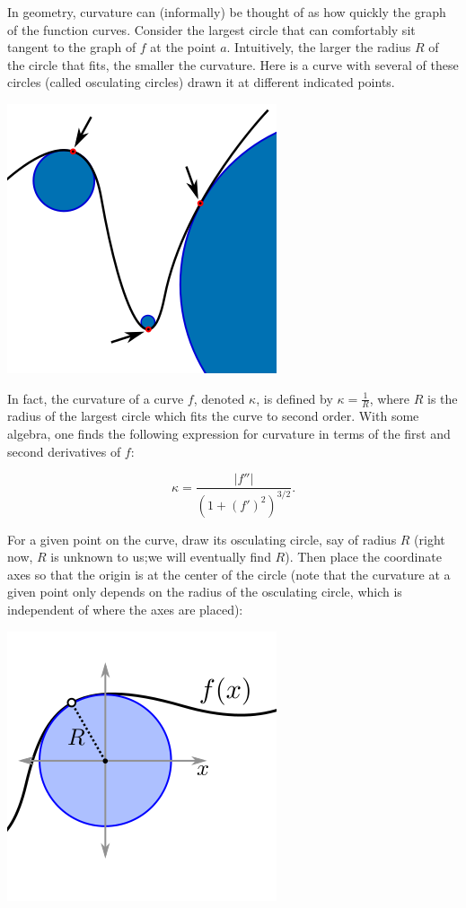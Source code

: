 \documentclass[twoside,openright,titlepage,a4paper]{book}
\begin{document}
\begin{sloppypar}
In geometry, curvature can (informally) be thought of as how quickly the graph of the function curves. Consider the largest circle that can comfortably sit tangent to the graph of $f$ at the point $a$. Intuitively, the larger the radius $R$ of the circle that fits, the smaller the curvature. Here is a curve with several of these circles (called osculating circles) drawn it at different indicated points.
\begin{center}\includegraphics[scale=0.6]{Curvature}\end{center}

In fact, the curvature of a curve $f$, denoted $\kappa$, is defined by $\kappa = \frac{1}{R}$, where $R$ is the radius of the largest circle which fits the curve to second order. With some algebra, one finds the following expression for curvature in terms of the first and second derivatives of $f$:

\begin{definitionbox}[title=\textbf{Curvature of a function $f$}]
	\[ \kappa = \frac{|f''|}{(1+(f')^2)^{3/2}}. \]
\end{definitionbox}

For a given point on the curve, draw its osculating circle, say of radius $R$ (right now, $R$ is unknown to us;we will eventually find $R$). Then place the coordinate axes so that the origin is at the center of the circle (note that the curvature at a given point only depends on the radius of the osculating circle, which is independent of where the axes are placed):
\begin{center}\includegraphics[scale=0.6]{Osculating}\end{center}


\end{sloppypar}
\end{document}
